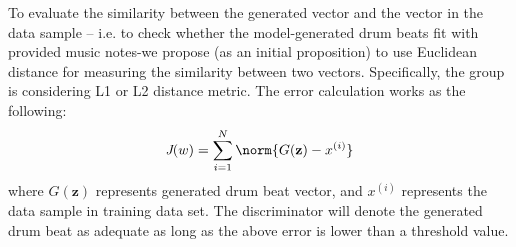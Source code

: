 \begin{par}
      \par To evaluate the similarity between the generated vector and 
      the vector in the data sample -- i.e. to check whether the model-generated drum beats 
      fit with provided music notes-we propose (as an initial proposition) to use Euclidean distance for 
      measuring the similarity between two vectors. Specifically, the group is considering L1 or L2 
      distance metric. The error calculation works as the following: 
      \begin{equation}
          \emph{J}(w) = \sum_{i=1}^{N} \norm{G(\mathbf{z})-x^{(i)}}
      \end{equation}
      where $G(\mathbf{z})$ represents generated drum beat vector, and $x^{(i)}$
      represents the data sample in training data set. The discriminator will denote the generated drum 
      beat as adequate as long as the above error is lower than a threshold value.
  
  \end{par}